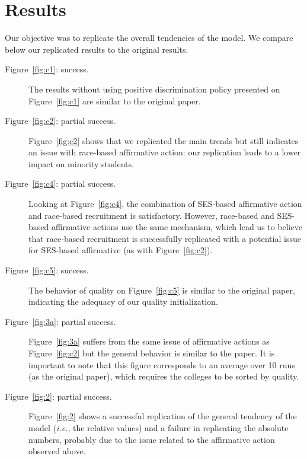 \section{Results}\label{sec:results}

Our objective was to replicate the overall tendencies of the model. 
We compare below our replicated results to the original results.

\begin{description}

\item[Figure~\ref{fig:c1}: success.] The results without using positive discrimination policy presented on Figure~\ref{fig:c1} are similar to the original paper.

\item[Figure~\ref{fig:c2}: partial success.] Figure~\ref{fig:c2} shows that we replicated the main trends but still indicates an issue with race-based affirmative action: our replication leads to a lower impact on minority students.

\item [Figure~\ref{fig:c4}: partial success.] Looking at Figure~\ref{fig:c4}, the combination of SES-based affirmative action and race-based recruitment is satisfactory. 
However, race-based and SES-based affirmative actions use the same mechanism, which lead us to believe that race‐based recruitment is successfully replicated with a potential issue for SES-based affirmative (as with Figure~\ref{fig:c2}).

\item [Figure~\ref{fig:c5}: success.]  The behavior of quality on Figure~\ref{fig:c5} is similar to the original paper, indicating the adequacy of our quality initialization.

\item[Figure~\ref{fig:3a}: partial success.]  Figure~\ref{fig:3a} suffers from the same issue of affirmative actions as Figure~\ref{fig:c2} but the general behavior is similar to the paper. 
It is important to note that this figure corresponds to an average over 10 runs (as the original paper), which requires the colleges to be sorted by quality.

\item[Figure~\ref{fig:2}: partial success.]  Figure~\ref{fig:2} shows a successful replication of the general tendency of the model (\emph{i.e.}, the relative values) and a failure in replicating the absolute numbers, probably due to the issue related to the affirmative action observed above.


\end{description}
